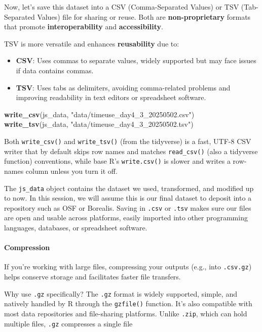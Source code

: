 \documentclass[
]{article}
\newenvironment{Shaded}{\begin{snugshade}}{\end{snugshade}}
\newcommand{\FunctionTok}[1]{\textcolor[rgb]{0.13,0.29,0.53}{\textbf{#1}}}
\newcommand{\NormalTok}[1]{#1}
\newcommand{\StringTok}[1]{\textcolor[rgb]{0.31,0.60,0.02}{#1}}
\providecommand{\tightlist}{%
  \setlength{\itemsep}{0pt}\setlength{\parskip}{0pt}}
\begin{document}
Now, let's save this dataset into a CSV (Comma-Separated Values) or TSV
(Tab-Separated Values) file for sharing or reuse. Both are
\textbf{non-proprietary} formats that promote \textbf{interoperability}
and \textbf{accessibility}.

TSV is more versatile and enhances \textbf{reusability} due to:

\begin{itemize}
\tightlist
\item
  \textbf{CSV}: Uses commas to separate values, widely supported but may
  face issues if data contains commas.
\item
  \textbf{TSV}: Uses tabs as delimiters, avoiding comma-related problems
  and improving readability in text editors or spreadsheet software.
\end{itemize}

\begin{Shaded}
\begin{Highlighting}[]
\FunctionTok{write\_csv}\NormalTok{(js\_data, }\StringTok{"data/timeuse\_day4\_3\_20250502.csv"}\NormalTok{)}
\FunctionTok{write\_tsv}\NormalTok{(js\_data, }\StringTok{"data/timeuse\_day4\_3\_20250502.tsv"}\NormalTok{)}
\end{Highlighting}
\end{Shaded}

Both \texttt{write\_csv()} and \texttt{write\_tsv()} (from the
tidyverse) is a fast, UTF-8 CSV writer that by default skips row names
and matches \texttt{read\_csv()} (also a tidyverse function)
conventions, while base R's \texttt{write.csv()} is slower and writes a
row-names column unless you turn it off.

The \texttt{js\_data} object contains the dataset we used, transformed,
and modified up to now. In this session, we will assume this is our
final dataset to deposit into a repository such as OSF or Borealis.
Saving in \texttt{.csv} or \texttt{.tsv} makes sure our files are open
and usable across platforms, easily imported into other programming
languages, databases, or spreadsheet software.

\paragraph{Compression}\label{compression}

If you're working with large files, compressing your outputs (e.g., into
\texttt{.csv.gz}) helps conserve storage and facilitates faster file
transfers.

Why use \texttt{.gz} specifically? The \texttt{.gz} format is widely
supported, simple, and natively handled by R through the
\texttt{gzfile()} function. It's also compatible with most data
repositories and file-sharing platforms. Unlike \texttt{.zip}, which can
hold multiple files, \texttt{.gz} compresses a single file
\end{document}
